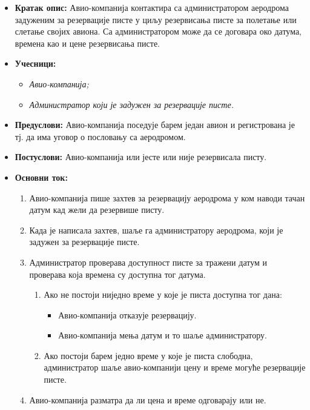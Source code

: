 \documentclass{article}
\begin{document}
\begin{itemize}
    \item \textbf{Кратак опис:} Авио-компанија контактира са администратором аеродрома задуженим за резервације писте у циљу резервисања писте за полетање или слетање својих авиона. Са администратором може да се договара око датума, времена као и цене резервисања писте.
    \item \textbf{Учесници:}
        \begin{itemize}
            \item \textit{Авио-компанија;}
            \item \textit{Администратор који је задужен за резервације писте.}
        \end{itemize}
    \item \textbf{Предуслови:} Авио-компанија поседује барем један авион и регистрована је тј. да има уговор о пословању са аеродромом.
    \item \textbf{Постуслови:} Авио-компанија или јесте или није резервисала писту.
    \newpage
    \item \textbf{Основни ток:}
        \begin{enumerate}
            \item Авио-компанија пише захтев за резервацију аеродрома у ком наводи тачан датум кад жели да резервише писту.
            \item Када је написала захтев, шаље га администратору аеродрома, који је задужен за резервације писте.
            \item Администратор проверава доступност писте за тражени датум и проверава која времена су доступна тог датума. 
                \begin{enumerate}
                    \item Ако не постоји ниједно време у које је писта доступна тог дана:
                        \begin{itemize}
                            \item Авио-компанија отказује резервацију.
                            \item Авио-компанија мења датум и то шаље администратору.
                        \end{itemize}
                    \item Ако постоји барем једно време у које је писта слободна, администратор шаље авио-компанији цену и време могуће резервације писте.
                \end{enumerate}
            \item Авио-компанија разматра да ли цена и време одговарају или не.

\end{enumerate}
\end{itemize}
\end{document}
